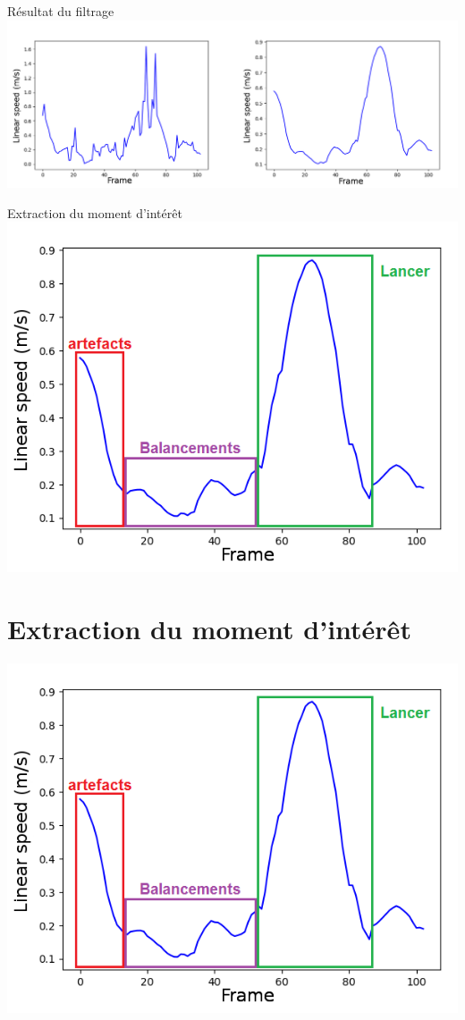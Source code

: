 \documentclass[svgnames]{beamer}
\begin{document}
	\begin{frame}{Résultat du filtrage}
	\centering
		\includegraphics[scale=0.4]{img/before_after_savgol.png}
	\end{frame}
	
	\begin{frame}{Extraction du moment d'intérêt}
	\centering
		\includegraphics[scale=0.4]{img/after_savgol_explained.png}
	\end{frame}
	
	\section{Extraction du moment d'intérêt}
	\begin{frame}{\secname}
	\centering
		\includegraphics[scale=0.4]{img/after_savgol_explained.png}
	\end{frame}
	
\end{document}
